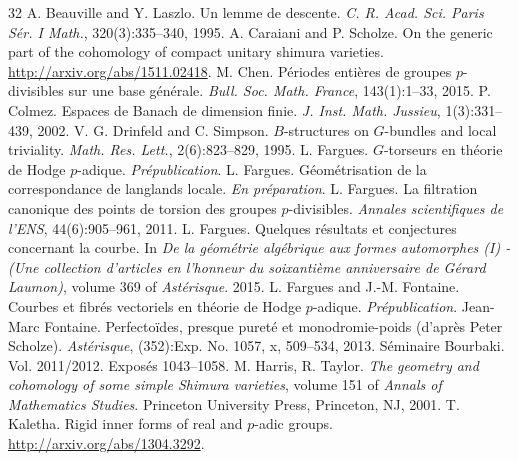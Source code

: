 
\begin{thebibliography}{32}
 A. Beauville and Y. Laszlo. Un lemme de descente. \textit{C. R. Acad. Sci. Paris Sér. I Math.}, 320(3):335--340, 1995.
 A. Caraiani and P. Scholze. On the generic part of the cohomology of compact unitary shimura varieties. \url{http://arxiv.org/abs/1511.02418}.
 M. Chen. Périodes entières de groupes $p$-divisibles sur une base générale. \textit{Bull. Soc. Math. France}, 143(1):1--33, 2015.
 P. Colmez. Espaces de Banach de dimension finie. \textit{J. Inst. Math. Jussieu}, 1(3):331--439, 2002.
 V. G. Drinfeld and C. Simpson. $B$-structures on $G$-bundles and local triviality. \textit{Math. Res. Lett.}, 2(6):823--829, 1995.
 L. Fargues. $G$-torseurs en théorie de Hodge $p$-adique. \textit{Prépublication}.
 L. Fargues. Géométrisation de la correspondance de langlands locale. \textit{En préparation}.
 L. Fargues. La filtration canonique des points de torsion des groupes $p$-divisibles. \textit{Annales scientifiques de l'ENS}, 44(6):905--961, 2011.
 L. Fargues. Quelques résultats et conjectures concernant la courbe. In \textit{De la géométrie algébrique aux formes automorphes (I) - (Une collection d'articles en l'honneur du soixantième anniversaire de Gérard Laumon)}, volume 369 of \textit{Astérisque}. 2015.
 L. Fargues and J.-M. Fontaine. Courbes et fibrés vectoriels en théorie de Hodge $p$-adique. \textit{Prépublication}.
 Jean-Marc Fontaine. Perfectoïdes, presque pureté et monodromie-poids (d'après Peter Scholze). \textit{Astérisque}, (352):Exp. No. 1057, x, 509--534, 2013. Séminaire Bourbaki. Vol. 2011/2012. Exposés 1043--1058.
 M. Harris, R. Taylor. \textit{The geometry and cohomology of some simple Shimura varieties}, volume 151 of \textit{Annals of Mathematics Studies}. Princeton University Press, Princeton, NJ, 2001.
 T. Kaletha. Rigid inner forms of real and $p$-adic groups. \url{http://arxiv.org/abs/1304.3292}.

\end{thebibliography}
